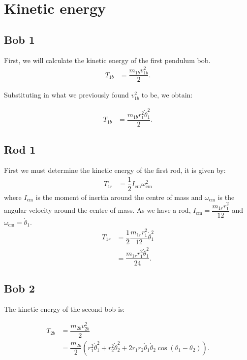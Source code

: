 \documentclass[12pt,a4paper,portrait]{article}
\begin{document}
	\section{Kinetic energy}
	
	\subsection{Bob 1}
	First, we will calculate the kinetic energy of the first pendulum bob. 
	\begin{align*}
		T_{1b} &= \dfrac{m_{1b}v_{1b}^2}{2}.
	\end{align*}
	
	Substituting in what we previously found $v_{1b}^2$ to be, we obtain:
	
	\begin{align*}
		T_{1b} &= \dfrac{m_{1b} r_1^2 \dot{\theta}_1^2}{2}.
	\end{align*}
	\subsection{Rod 1}
	First we must determine the kinetic energy of the first rod, it is given by:
	\begin{align*}
		T_{1r} &= \dfrac{1}{2} I_{\mathrm{cm}} \omega_{\mathrm{cm}}^2
	\end{align*}
	where $I_{\mathrm{cm}}$ is the moment of inertia around the centre of mass and $\omega_{\mathrm{cm}}$ is the angular velocity around the centre of mass. As we have a rod, $I_{\mathrm{cm}} = \dfrac{m_{1r}r_1^2}{12}$ and $\omega_{\mathrm{cm}} = \dot{\theta}_1$. 
	\begin{align*}
		T_{1r} &= \dfrac{1}{2}\dfrac{m_{1r} r_1^2}{12}\dot{\theta}_1^2 \\
		&= \dfrac{m_{1r} r_1^2\dot{\theta}_1^2}{24}.
	\end{align*}
	
	\subsection{Bob 2}
	The kinetic energy of the second bob is:
	
	\begin{align*}
		T_{2b} &= \dfrac{m_{2b} v_{2b}^2}{2} \\
		&= \dfrac{m_{2b}}{2} \left(r_1^2 \dot{\theta}_1^2 + r_2^2 \dot{\theta}_2^2 + 2r_1 r_2 \dot{\theta}_1 \dot{\theta}_2 \cos{\left(\theta_1-\theta_2\right)}\right).
	\end{align*}
	
\end{document}

